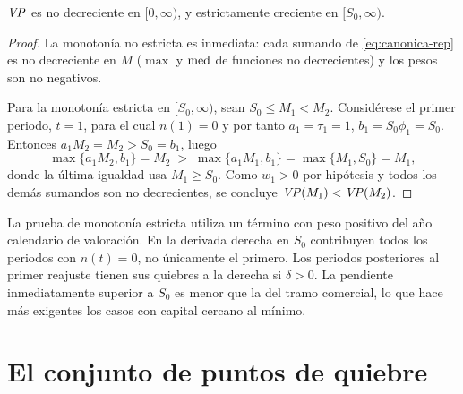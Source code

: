 \begin{proposition}[Monotonía]
\label{prop:monotonia}
$\mathit{VP}$ es no decreciente en $[0,\infty)$, y estrictamente creciente en
$[S_0,\infty)$.
\end{proposition}
\begin{proof}
La monotonía no estricta es inmediata: cada sumando de \cref{eq:canonica-rep} es no
decreciente en $M$ ($\max$ y $\operatorname{med}$ de funciones no decrecientes) y los pesos son
no negativos.

Para la monotonía estricta en $[S_0,\infty)$, sean $S_0\le M_1<M_2$. Considérese
el primer periodo, $t=1$, para el cual $n(1)=0$ y por tanto $a_1=\tau_1=1$,
$b_1=S_0\phi_1=S_0$. Entonces $a_1M_2=M_2>S_0=b_1$, luego
\[
  \max\{a_1M_2,b_1\}=M_2 \;>\; \max\{a_1M_1,b_1\}=\max\{M_1,S_0\}=M_1 ,
\]
donde la última igualdad usa $M_1\ge S_0$. Como $w_1>0$ por hipótesis y todos los
demás sumandos son no decrecientes, se concluye $\mathit{VP}(M_1)<\mathit{VP}(M_2)$.
\end{proof}

\begin{remark}
La prueba de monotonía estricta utiliza un término con peso positivo
del año calendario de valoración. En la derivada derecha en $S_0$
contribuyen todos los periodos con $n(t)=0$, no únicamente el primero.
Los periodos posteriores al primer reajuste tienen sus quiebres a la
derecha si $\delta>0$. La pendiente inmediatamente superior a $S_0$
es menor que la del tramo comercial, lo que hace más exigentes los
casos con capital cercano al mínimo.

\end{remark}

\section{El conjunto de puntos de quiebre}


